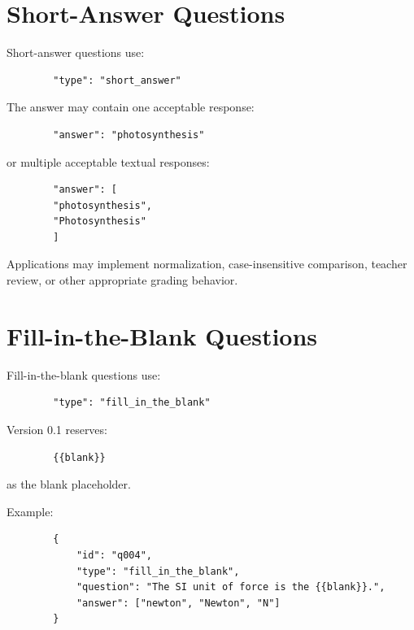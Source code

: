 \documentclass[11pt]{article}
\begin{document}
	\section{Short-Answer Questions}
	
	Short-answer questions use:
	
	\begin{lstlisting}
		"type": "short_answer"
	\end{lstlisting}
	
	The answer may contain one acceptable response:
	
	\begin{lstlisting}
		"answer": "photosynthesis"
	\end{lstlisting}
	
	or multiple acceptable textual responses:
	
	\begin{lstlisting}
		"answer": [
		"photosynthesis",
		"Photosynthesis"
		]
	\end{lstlisting}
	
	Applications may implement normalization, case-insensitive comparison,
	teacher review, or other appropriate grading behavior.
	
	\section{Fill-in-the-Blank Questions}
	
	Fill-in-the-blank questions use:
	
	\begin{lstlisting}
		"type": "fill_in_the_blank"
	\end{lstlisting}
	
	Version 0.1 reserves:
	
	\begin{lstlisting}
		{{blank}}
	\end{lstlisting}
	
	as the blank placeholder.
	
	Example:
	
	\begin{lstlisting}
		{
			"id": "q004",
			"type": "fill_in_the_blank",
			"question": "The SI unit of force is the {{blank}}.",
			"answer": ["newton", "Newton", "N"]
		}
	\end{lstlisting}
	
\end{document}

